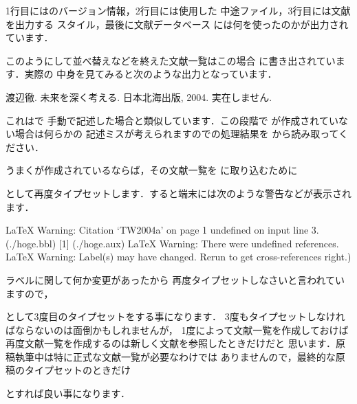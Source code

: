 1行目には{\JBibTeX}のバージョン情報，2行目には使用した
中途ファイル，3行目には文献を出力する
スタイル，最後に文献データベース 
には何を使ったのかが出力されています．

このようにして並べ替えなどを終えた文献一覧はこの場合
に書き出されています．実際の
中身を見てみると次のような出力となっています．

\begin{InTeX}
\begin{thebibliography}{1}
 渡辺徹.
\newblock 未来を深く考える.
\newblock 日本北海出版, 2004.
\newblock 実在しません.
\end{thebibliography} 
\end{InTeX}

これはで
手動で記述した場合と類似しています．この段階で
が作成されていない場合は何らかの
記述ミスが考えられますので{\JBibTeX}の処理結果を
から読み取ってください．

うまくが作成されているならば，その文献一覧を
に取り込むために
\begin{InTerm}
\end{InTerm}
として再度タイプセットします．すると端末には次のような警告などが表示され
ます．

\begin{OutTerm}
LaTeX Warning: Citation `TW2004a' on page 1 undefined on input line 3.
(./hoge.bbl) [1] (./hoge.aux)
LaTeX Warning: There were undefined references.
LaTeX Warning: Label(s) may have changed. 
Rerun to get cross-references right.) 
\end{OutTerm}

ラベルに関して何か変更があったから
再度タイプセットしなさいと言われていますので，
\begin{InTerm}
\end{InTerm}
として3度目のタイプセットをする事になります．
3度もタイプセットしなければならないのは面倒かもしれませんが，
1度{\JBibTeX}によって文献一覧を作成しておけば
再度文献一覧を作成するのは新しく文献を参照したときだけだと
思います．原稿執筆中は特に正式な文献一覧が必要なわけでは
ありませんので，最終的な原稿のタイプセットのときだけ
\begin{InTerm}
\end{InTerm}
とすれば良い事になります．


